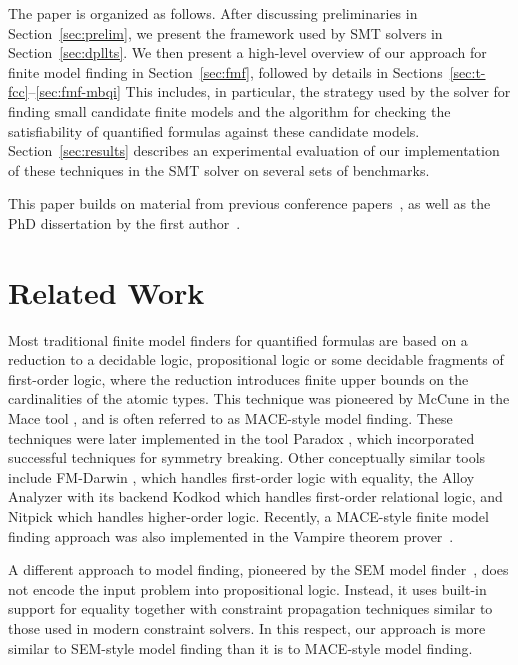 \documentclass{svjour3}                     %
\begin{document}
The paper is organized as follows.
After discussing preliminaries in Section~\ref{sec:prelim},
we present the framework used by SMT solvers in Section~\ref{sec:dpllts}.
We then present a high-level overview of our approach for finite model finding in Section~\ref{sec:fmf},
followed by details in Sections~\ref{sec:t-fcc}--\ref{sec:fmf-mbqi}
This includes, in particular, the strategy used by the solver 
for finding small candidate finite models and the algorithm for checking 
the satisfiability of quantified formulas against these candidate models.
Section~\ref{sec:results} describes an experimental evaluation 
of our implementation of these techniques in the SMT solver \cvc
on several sets of benchmarks.

This paper builds on material from previous conference papers~\cite{ReyEtAl-1-RR-13,ReyEtAl-2-RR-13},
as well as the PhD dissertation by the first author~\cite{reynolds2013finite}.

\section{Related Work}

Most traditional finite model finders for quantified formulas are based 
on a reduction to a decidable logic,
propositional logic or some decidable fragments of first-order logic, 
where the reduction introduces finite upper bounds on
the cardinalities of the atomic types. This technique was pioneered by McCune
in the Mace tool \cite{mccune-1994}, and is often referred to as MACE-style model finding.
These techniques were later implemented in the tool Paradox \cite{Claessen:Soerensson:MACEimprove:ModelComputationWS:2003},
which incorporated successful techniques for symmetry breaking.
Other conceptually similar tools include FM-Darwin \cite{baumgartner-et-al-2009}, which handles first-order logic with
equality, the Alloy Analyzer with its backend Kodkod \cite{TorJac-TACAS-07}
which handles first-order relational logic, and Nitpick \cite{blanchette-nipkow-2010} which handles higher-order logic.
Recently, a MACE-style finite model finding approach was also implemented in the Vampire theorem prover~\cite{DBLP:conf/sat/Reger0V16}.

A different approach to model finding, 
pioneered by the SEM model finder~\cite{Zhang1995IJCAI}, 
does not encode the input problem into propositional logic.
Instead, it uses built-in support for equality together with constraint propagation techniques 
similar to those used in modern constraint solvers.
In this respect, our approach is more similar to
SEM-style model finding than it is to MACE-style model finding.
\end{document}
